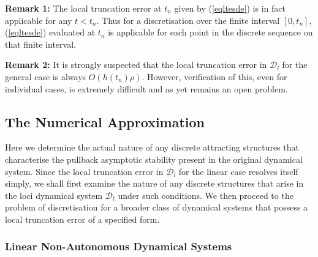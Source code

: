 \textbf{Remark 1: } The local truncation error at $t_n$ given by
(\ref{eqltesde}) is in fact applicable for any $t < t_n$. Thus for a
discretisation over the finite interval $[0, t_n]$, (\ref{eqltesde}) evaluated
at $t_n$ is applicable for each point in the discrete sequence on that finite
interval.

\textbf{Remark 2:} It is strongly suspected that the local truncation error in
$\mathcal{D}_l$ for the general case is always $O(h(t_n) \rho)$.
However, verification of this, even for individual cases, is extremely
difficult and as yet remains an open problem.

\subsection{The Numerical Approximation}

Here we determine the actual nature of any discrete attracting structures that
characterise the pullback asymptotic stability present in the original
dynamical system. Since the local truncation error in $\mathcal{D}_l$ for the
linear case resolves itself simply, we shall first examine the nature of any
discrete structures that arise in the loci dynamical system $\mathcal{D}_l$
under such conditions. We then proceed to the problem of discretisation for a
broader class of dynamical systems that possess a local truncation error of a
specified form.

\subsubsection{Linear Non-Autonomous Dynamical Systems}

